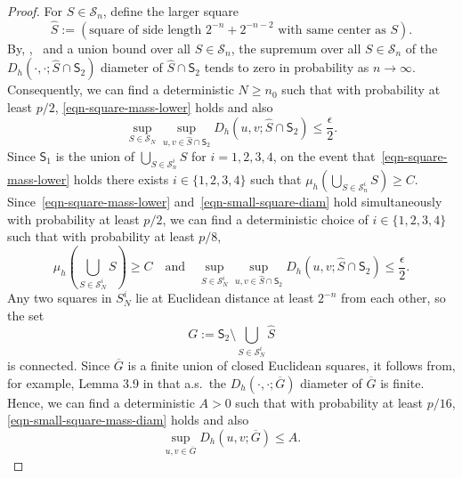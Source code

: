\documentclass[12pt]{amsart}
\numberwithin{equation}{section}
\begin{document}
\begin{proof}
		
		For $S\in\mathcal  S_n$, define the larger square
		\begin{equation}
		\hat S := \left( \text{square of side length $2^{-n}  + 2^{-n-2}$ with same center as $S$} \right). 
		\end{equation}
		By, \eg,~\cite[Lemma 3.19]{dubedat2020weak} and a union bound over all $S\in\mathcal  S_n$, the supremum over all $S\in \mathcal  S_n$ of the $D_h(\cdot,\cdot ; \hat S \cap \mathsf S_2 )$ diameter of $\hat S \cap \mathsf S_2$ tends to zero in probability as $n\to\infty$. Consequently, we can find a deterministic $N \geq n_0$ such that with probability at least $p/2$, \eqref{eqn-square-mass-lower} holds and also 
		\begin{equation} \label{eqn-small-square-diam}
		\sup_{S\in\mathcal  S_N} \sup_{u,v\in  \hat S \cap \mathsf S_2  } D_h(u,v ; \hat S \cap \mathsf S_2  ) \leq \frac{\epsilon}{2} .
		\end{equation}
		Since $\mathsf S_1$ is the union of $\bigcup_{S\in \mathcal  S_n^i} S$ for $i=1,2,3,4$, on the event that~\eqref{eqn-square-mass-lower} holds there exists $i\in \{1,2,3,4\}$ such that $\mu_h\left(  \bigcup_{S\in \mathcal  S_n^i} S \right) \geq C$. Since~\eqref{eqn-square-mass-lower} and~\eqref{eqn-small-square-diam} hold simultaneously with probability at least $p/2$, we can find a deterministic choice of $i\in \{1,2,3,4\}$ such that with probability at least $p/8$, 
		\begin{equation} \label{eqn-small-square-mass-diam}
		\mu_h\left(  \bigcup_{S\in \mathcal  S_N^i} S \right) \geq C \quad \text{and} \quad \sup_{S\in\mathcal  S_N^i} \sup_{u,v\in  \hat S \cap \mathsf S_2 } D_h(u,v ; \hat S \cap \mathsf S_2 ) \leq \frac{\epsilon}{2}  .
		\end{equation}
		Any two squares in $S_N^i$ lie at Euclidean distance at least $2^{-n}$ from each other, so the set 
		\begin{equation}
		G := \mathsf S_2 \setminus \bigcup_{S\in\mathcal  S_N^i} \hat S
		\end{equation}
		is connected. Since $\overline G$ is a finite union of closed Euclidean squares, it follows from, for example, Lemma 3.9 in \cite{dubedat2020weak} that a.s.\ the $D_h(\cdot,\cdot;\overline G)$ diameter of $\overline G$ is finite. Hence, we can find a deterministic $A > 0$ such that with probability at least $p/16$, \eqref{eqn-small-square-mass-diam} holds and also
		\begin{equation} \label{eqn-exterior-diam} 
		\sup_{u,v\in \overline G} D_h(u,v;\overline G) \leq A .
		\end{equation}
		

\end{proof}
\end{document}
